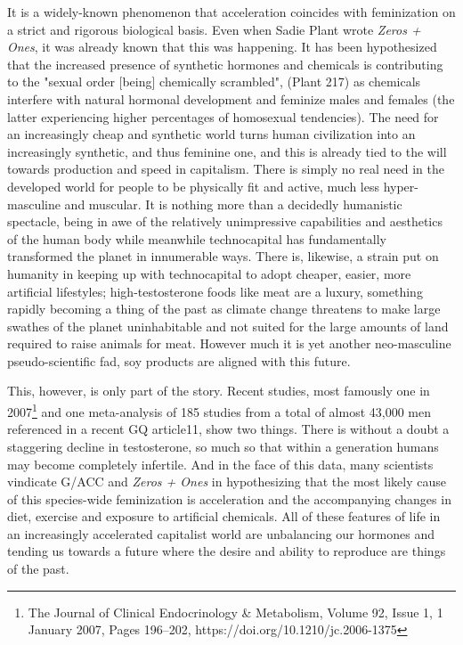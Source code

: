 \documentclass[12pt, a5paper, twoside, openright]{memoir}
\begin{document}
It is a widely-known phenomenon that acceleration coincides with feminization on a strict and rigorous biological basis. Even when Sadie Plant wrote \textit{Zeros + Ones}, it was already known that this was happening. It has been hypothesized that the increased presence of synthetic hormones and chemicals is contributing to the "sexual order [being] chemically scrambled", (Plant 217) as chemicals interfere with natural hormonal development and feminize males and females (the latter experiencing higher percentages of homosexual tendencies). The need for an increasingly cheap and synthetic world turns human civilization into an increasingly synthetic, and thus feminine one, and this is already tied to the will towards production and speed in capitalism. There is simply no real need in the developed world for people to be physically fit and active, much less hyper-masculine and muscular. It is nothing more than a decidedly humanistic spectacle, being in awe of the relatively unimpressive capabilities and aesthetics of the human body while meanwhile technocapital has fundamentally transformed the planet in innumerable ways. There is, likewise, a strain put on humanity in keeping up with technocapital to adopt cheaper, easier, more artificial lifestyles; high-testosterone foods like meat are a luxury, something rapidly becoming a thing of the past as climate change threatens to make large swathes of the planet uninhabitable and not suited for the large amounts of land required to raise animals for meat. However much it is yet another neo-masculine pseudo-scientific fad, soy products are aligned with this future.

This, however, is only part of the story. Recent studies, most famously one in 2007\footnote{The Journal of Clinical Endocrinology \& Metabolism, Volume 92, Issue 1, 1 January 2007, Pages 196–202, https://doi.org/10.1210/jc.2006-1375} and one meta-analysis of 185 studies from a total of almost 43,000 men referenced in a recent GQ article11, show two things. There is without a doubt a staggering decline in testosterone, so much so that within a generation humans may become completely infertile. And in the face of this data, many scientists vindicate G/ACC and \textit{Zeros + Ones} in hypothesizing that the most likely cause of this species-wide feminization is acceleration and the accompanying changes in diet, exercise and exposure to artificial chemicals. All of these features of life in an increasingly accelerated capitalist world are unbalancing our hormones and tending us towards a future where the desire and ability to reproduce are things of the past.
\end{document}
